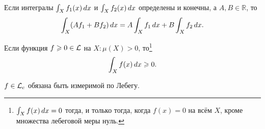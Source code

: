 
\begin{to_thr}
\label{5.70}
    Если интегралы $\int_X f_1 (x) \, d x$ и $\int_X f_2 (x) \, d x$ определены и конечны, а $A, B \in \mathbb{R}$, то 
    $$
        \int_X (Af_1 + B f_2) \, d x = A \int_X f_1 \, d x + B \int_X f_2 \, d x.
    $$
\end{to_thr}

\begin{to_thr}
\label{5.71}
    Если функция $f \geqslant 0 \in \mathcal{L}$ на $X \colon \mu(X) > 0$, то\footnote{
        $\int_X f(x) \, d x = 0$ тогда, и только тогда, когда $f(x) = 0$ на всём $X$, кроме множества лебеговой меры нуль. 
    } 
    $$
        \int_X f(x) \, d x \geqslant 0.
    $$
\end{to_thr}

\begin{to_thr}
\label{5.72}
    $f \in \mathcal{L}_c$ обязана быть измеримой по Лебегу.
\end{to_thr}